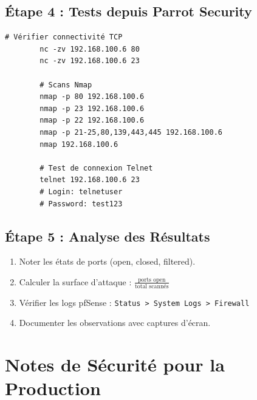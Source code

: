 \documentclass[12pt,a4paper,openany]{report}
\begin{document}
	\subsection{Étape 4 : Tests depuis Parrot Security}
	\begin{lstlisting}[caption=Séquence de tests]
		# Vérifier connectivité TCP
		nc -zv 192.168.100.6 80
		nc -zv 192.168.100.6 23
		
		# Scans Nmap
		nmap -p 80 192.168.100.6
		nmap -p 23 192.168.100.6
		nmap -p 22 192.168.100.6
		nmap -p 21-25,80,139,443,445 192.168.100.6
		nmap 192.168.100.6
		
		# Test de connexion Telnet
		telnet 192.168.100.6 23
		# Login: telnetuser
		# Password: test123
	\end{lstlisting}
	
	\subsection{Étape 5 : Analyse des Résultats}
	\begin{enumerate}
		\item Noter les états de ports (open, closed, filtered).
		\item Calculer la surface d'attaque : $\frac{\text{ports open}}{\text{total scannés}}$
		\item Vérifier les logs pfSense : \texttt{Status > System Logs > Firewall}
		\item Documenter les observations avec captures d'écran.
	\end{enumerate}
	
	
	\section{Notes de Sécurité pour la Production}
	
\end{document}
